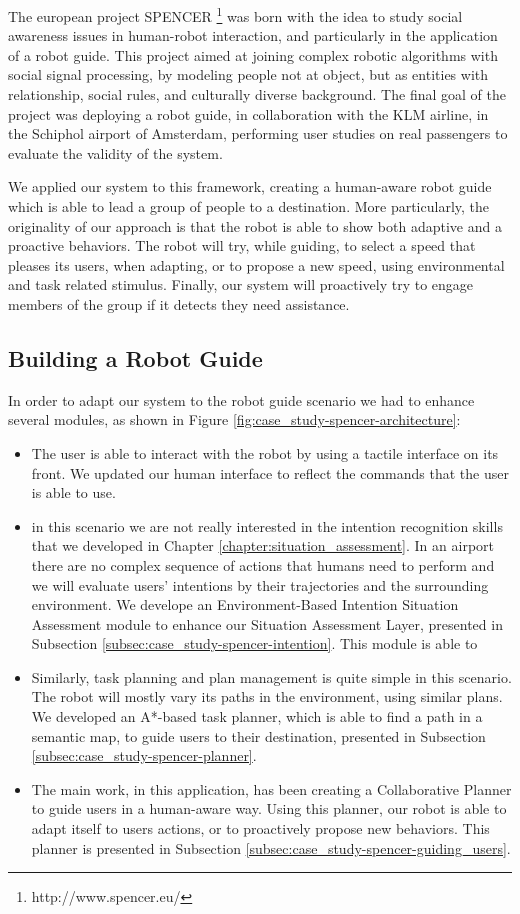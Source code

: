 The european project SPENCER \footnote{http://www.spencer.eu/} was born with the idea to study social awareness issues in human-robot interaction, and particularly in the application of a robot guide. This project aimed at joining complex robotic algorithms  with social signal processing, by modeling people not at object, but as entities with relationship, social rules, and culturally diverse background. The final goal of the project was deploying a robot guide, in collaboration with the KLM airline, in the Schiphol airport of Amsterdam, performing user studies on real passengers to evaluate the validity of the system.

We applied our system to this framework, creating a human-aware robot guide which is able to lead a group of people to a destination. More particularly, the originality of our approach is that the robot is able to show both adaptive and a proactive behaviors. The robot will try, while guiding, to select a speed that pleases its users, when adapting, or to propose a new speed, using environmental and task related stimulus. Finally, our system will proactively try to engage members of the group if it detects they need assistance. 

\subsection{Building a Robot Guide}
In order to adapt our system to the robot guide scenario we had to enhance several modules, as shown in Figure \ref{fig:case_study-spencer-architecture}: 
\begin{itemize}
\item The user is able to interact with the robot by using a tactile interface on its front. We updated our human interface to reflect the commands that the user is able to use.
\item in this scenario we are not really interested in the intention recognition skills that we developed in Chapter \ref{chapter:situation_assessment}. In an airport there are no complex sequence of actions that humans need to perform and we will evaluate users' intentions by their trajectories and the surrounding environment. We develope an Environment-Based Intention Situation Assessment module to enhance our Situation Assessment Layer, presented in Subsection \ref{subsec:case_study-spencer-intention}. This module is able to 
\item Similarly, task planning and plan management is quite simple in this scenario. The robot will mostly vary its paths in the environment, using similar plans. We developed an A*-based task planner, which is able to find a path in a semantic map, to guide users to their destination, presented in Subsection \ref{subsec:case_study-spencer-planner}.
\item The main work, in this application, has been creating a Collaborative Planner to guide users in a human-aware way. Using this planner, our robot is able to adapt itself to users actions, or to proactively propose new behaviors. This planner is presented in Subsection \ref{subsec:case_study-spencer-guiding_users}.
\end{itemize} 


